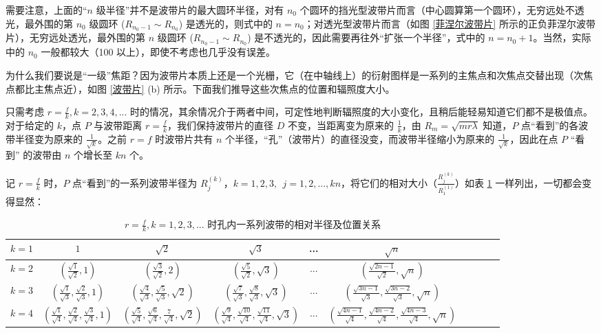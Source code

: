 \documentclass[UTF8]{report}
\theoremstyle{MyLineTheoremStyle} %
\theoremstyle{MyBlockTheoremStyle} %
\theoremstyle{MySubsubsectionStyle} %
\begin{document}
需要注意，上面的“$n$ 级半径”并不是波带片的最大圆环半径，对有 $n_0$ 个圆环的挡光型波带片而言（中心圆算第一个圆环），无穷远处不透光，最外围的第 $n_0$ 级圆环 ($R_{n_0-1} \sim R_{n_0}$) 是透光的，则式中的 $n = n_0$；对透光型波带片而言（如图 \ref{菲涅尔波带片} 所示的正负菲涅尔波带片），无穷远处透光，最外围的第 $n$ 级圆环 ($R_{n_0-1} \sim R_{n_0}$) 是不透光的，因此需要再往外“扩张一个半径”，式中的 $n = n_0 + 1$。当然，实际中的 $n_0$ 一般都较大（100 以上），即使不考虑也几乎没有误差。


为什么我们要说是“一级”焦距？因为波带片本质上还是一个光栅，它（在中轴线上）的衍射图样是一系列的主焦点和次焦点交替出现（次焦点都比主焦点近），如图 \ref{波带片} (b) 所示。下面我们推导这些次焦点的位置和辐照度大小。

只需考虑 $r = \frac{f}{k}, k = 2, 3, 4, ...$ 时的情况，其余情况介于两者中间，可定性地判断辐照度的大小变化，且稍后能轻易知道它们都不是极值点。对于给定的 $k$，点 $P$ 与波带距离 $r = \frac{f}{k}$，我们保持波带片的直径 $D$ 不变，当距离变为原来的 $\frac{1}{k}$，由 $R_m = \sqrt{mr\lambda}$ 知道，$P$ 点“看到”的各波带半径变为原来的 $\frac{1}{\sqrt{k}}$。之前 $r = f$ 时波带片共有 $n$ 个半径，“孔”（波带片）的直径没变，而波带半径缩小为原来的 $\frac{1}{\sqrt{k}}$，因此在点 $P$ “看到” 的波带由 $n$ 个增长至 $kn$ 个。

记 $r = \frac{f}{k}$ 时，$P$ 点“看到”的一系列波带半径为 $R_j^{(k)}$，$k = 1, 2, 3, \ \ j = 1, 2, ..., kn$，将它们的相对大小（$\frac{R_j^{(k)}}{R_1^(1)}$）如表 \ref{孔内不同波带的半径及位置关系} 一样列出，一切都会变得显然：
\begin{table}[H]\centering
    \caption{$r = \frac{f}{k}, k = 1, 2, 3, ... $ 时孔内一系列波带的相对半径及位置关系}
    \label{孔内不同波带的半径及位置关系}
\begin{tabular}{cccccccccc}\toprule
    $k = 1$ & $1$ & $\sqrt{2}$ & $\sqrt{3}$  & ... & $\sqrt{n}$ \\
    \midrule
    $k = 2$ & $(\frac{\sqrt{1}}{\sqrt{2}}, 1)$ & $(\frac{\sqrt{3}}{\sqrt{2}}, 2)$ &  $(\frac{\sqrt{5}}{\sqrt{2}}, \sqrt{3})$  & ... & $(\frac{\sqrt{2n -1 }}{\sqrt{2}}, \sqrt{n})$  \\
    $k = 3$ &  $(\frac{\sqrt{1}}{\sqrt{3}}, \frac{\sqrt{2}}{\sqrt{3}}, 1)$ & $(\frac{\sqrt{4}}{\sqrt{3}}, \frac{\sqrt{5}}{\sqrt{3}}, \sqrt{2})$ &  $(\frac{\sqrt{7}}{\sqrt{3}}, \frac{\sqrt{8}}{\sqrt{3}}, \sqrt{3})$  & ... & $(\frac{\sqrt{3n -1 }}{\sqrt{3}}, \frac{\sqrt{3n-2}}{\sqrt{3}}, \sqrt{n})$   \\
    $k = 4$ &  $(\frac{\sqrt{1}}{\sqrt{4}}, \frac{\sqrt{2}}{\sqrt{4}}, \frac{\sqrt{3}}{\sqrt{4}}, 1)$ & $(\frac{\sqrt{5}}{\sqrt{4}}, \frac{\sqrt{6}}{\sqrt{4}}, \frac{7}{\sqrt{4}}, \sqrt{2})$ &  $(\frac{\sqrt{9}}{\sqrt{4}}, \frac{\sqrt{10}}{\sqrt{4}}, \frac{\sqrt{11}}{\sqrt{4}}, \sqrt{3})$  & ... & $(\frac{\sqrt{4n -1 }}{\sqrt{4}}, \frac{\sqrt{4n-2}}{\sqrt{4}}, \frac{\sqrt{4n-3}}{\sqrt{4}}, \sqrt{n})$   \\
    \bottomrule
\end{tabular}
\end{table}
\end{document}
